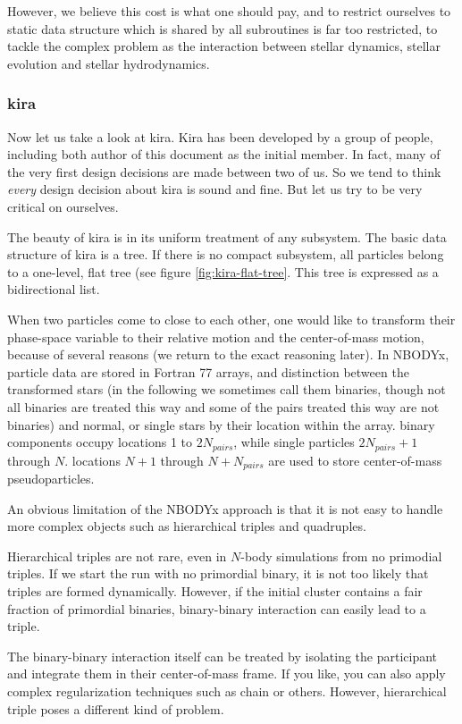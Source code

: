 \documentclass{article}[12pt]
\begin{document}
However, we believe this cost is what one should pay, and to restrict
ourselves to static data structure which is shared by all subroutines
is far too restricted, to tackle the complex problem as the
interaction between stellar dynamics, stellar evolution and stellar
hydrodynamics.

\subsubsection{kira}

Now let us take a look at kira. Kira has been developed by a group of
people, including both author of this document as the initial
member. In fact, many of the very first design decisions are made
between two of us. So we tend to think {\it every} design decision
about kira is sound and fine. But let us try to be very critical on
ourselves.

The beauty of kira is in its uniform treatment of any subsystem. The
basic data structure of kira is a tree. If there is no compact
subsystem, all particles belong to a one-level, flat tree (see figure
\ref{fig:kira-flat-tree}. This tree is expressed as a bidirectional
list.

When two particles come to close to each other, one would like to
transform their phase-space variable to their relative motion and the
center-of-mass motion, because of several reasons (we return to the
exact reasoning later). In NBODYx, particle data are stored in Fortran
77 arrays, and distinction between the transformed stars (in the
following we sometimes call them binaries, though not all binaries are
treated this way and some of the pairs treated this way are not
binaries) and normal, or single stars by their location within the
array. binary components occupy locations 1 to $2 N_{pairs}$, while
single particles $2 N_{pairs}+1$ through $N$. locations $N+1$ through
$N+N_{pairs}$ are used to store center-of-mass pseudoparticles.

An obvious limitation of the NBODYx approach is that it is not easy to
handle more complex objects such as hierarchical triples and
quadruples.

Hierarchical triples are not rare, even in $N$-body simulations from
no primodial triples. If we start the run with no primordial binary,
it is not too likely that triples are formed dynamically. However, if
the initial cluster contains a fair fraction of primordial binaries,
binary-binary interaction can easily lead to a triple.

The binary-binary interaction itself can be treated by isolating the
participant and integrate them in their center-of-mass frame. If you
like, you can also apply complex regularization techniques such as
chain or others. However, hierarchical triple poses a different kind
of problem.
\end{document}
